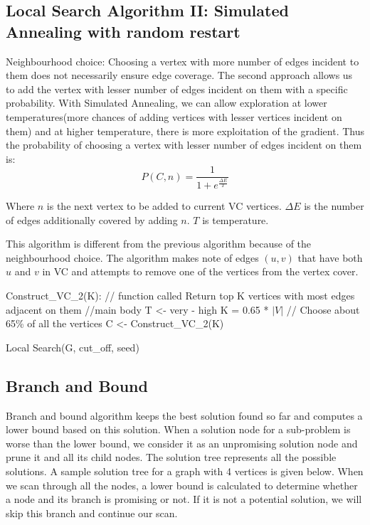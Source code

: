 \subsection{Local Search Algorithm II: Simulated Annealing with random restart}
Neighbourhood choice: Choosing a vertex with more number of edges incident to them does not necessarily ensure edge coverage. The second approach allows us to add the vertex with lesser number of edges incident on them with a specific probability. With Simulated Annealing, we can allow exploration at lower temperatures(more chances of adding vertices with lesser vertices incident on them) and at higher temperature, there is more exploitation of the gradient. Thus the probability of choosing a vertex with lesser number of edges incident on them is:
\begin{equation}
P\left( C,n \right)=\frac{1}{1+{{e}^{\frac{\Delta E}{T}}}}
\end{equation}

Where $n$ is the next vertex to be added to current VC vertices. $\Delta E$ is the number of edges additionally covered by adding $n$. $T$ is temperature.

This algorithm is different from the previous algorithm because of the neighbourhood choice. The algorithm makes note of edges $(u,v)$ that have both $u$ and $v$ in VC and attempts to remove one of the vertices from the vertex cover.

\begin{algorithm}[ht]
\SetAlgoNoLine
Construct\_VC\_2(K): // function called\;
Return top K vertices with most edges adjacent on them\;
//main body\;
T <- very - high\;
K = 0.65 * $|V|$ // Choose about 65\% of all the vertices\;
C <- Construct\_VC\_2(K)\;
\caption{Local Search(G, cut\_off, seed)}
\end{algorithm}
\subsection{Branch and Bound}
Branch and bound algorithm keeps the best solution found so far and computes a lower bound based on this solution. When a solution node for a sub-problem is worse than the lower bound, we consider it as an unpromising solution node and prune it and all its child nodes. The solution tree represents all the possible solutions. A sample solution tree for a graph with 4 vertices is given below. When we scan through all the nodes, a lower bound is calculated to determine whether a node and its branch is promising or not. If it is not a potential solution, we will skip this branch and continue our scan.

